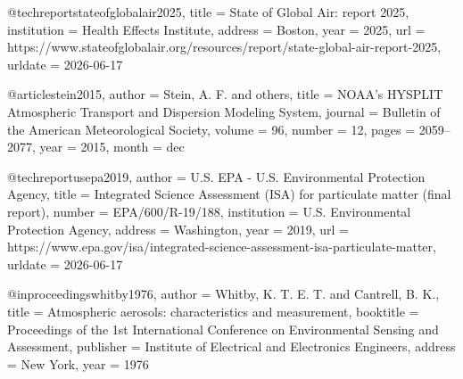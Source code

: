 @techreport{stateofglobalair2025,
	title       = {State of Global Air: report 2025},
	institution = {Health Effects Institute},
	address     = {Boston},
	year        = {2025},
	url         = {https://www.stateofglobalair.org/resources/report/state-global-air-report-2025},
	urldate     = {2026-06-17}
}

@article{stein2015,
	author  = {Stein, A. F. and others},
	title   = {NOAA's HYSPLIT Atmospheric Transport and Dispersion Modeling System},
	journal = {Bulletin of the American Meteorological Society},
	volume  = {96},
	number  = {12},
	pages   = {2059--2077},
	year    = {2015},
	month   = {dec}
}

@techreport{usepa2019,
	author      = {{U.S. EPA - U.S. Environmental Protection Agency}},
	title       = {Integrated Science Assessment (ISA) for particulate matter (final report)},
	number      = {EPA/600/R-19/188},
	institution = {U.S. Environmental Protection Agency},
	address     = {Washington},
	year        = {2019},
	url         = {https://www.epa.gov/isa/integrated-science-assessment-isa-particulate-matter},
	urldate     = {2026-06-17}
}

@inproceedings{whitby1976,
	author    = {Whitby, K. T. E. T. and Cantrell, B. K.},
	title     = {Atmospheric aerosols: characteristics and measurement},
	booktitle = {Proceedings of the 1st International Conference on Environmental Sensing and Assessment},
	publisher = {Institute of Electrical and Electronics Engineers},
	address   = {New York},
	year      = {1976}
}